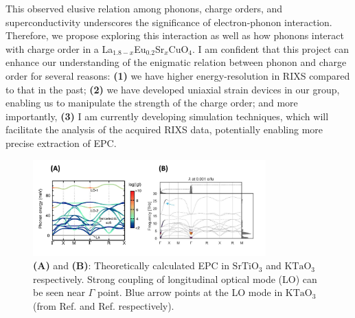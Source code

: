 \documentclass[11pt]{article}
\begin{document}
This observed elusive relation among phonons, charge orders, and superconductivity underscores the significance of electron-phonon interaction. 
Therefore, we propose exploring this interaction as well as how phonons interact with charge order in a {La$_{1.8-x}$Eu$_{0.2}$Sr$_x$CuO$_{4}$}. 
I am confident that this project can enhance our understanding of the enigmatic relation between phonon and charge order for several reasons: 
\textbf{(1)} we have higher energy-resolution in RIXS compared to that in the past; 
\textbf{(2)} we have developed uniaxial strain devices in our group, enabling us to manipulate the strength of the charge order; 
and more importantly, \textbf{(3)} I am currently developing simulation techniques, which will facilitate the analysis of the acquired RIXS data, potentially enabling more precise extraction of EPC.
\begin{figure}[!t]
    \centering
    \includegraphics[width=0.8\textwidth]{figures/new_second_figure.jpg}
    \caption{\textbf{(A)} and \textbf{(B)}: Theoretically calculated EPC in $\mathrm{SrTiO_3}$ and $\mathrm{KTaO_3}$ respectively. Strong coupling of longitudinal optical mode (LO) can be seen near $\Gamma$ point. Blue arrow points at the LO mode in  $\mathrm{KTaO_3}$ (from Ref.\cite{zhou_electron-phonon_2018} and Ref.\cite{esswein_first-principles_2023} respectively).}  
\end{figure}
\end{document}
